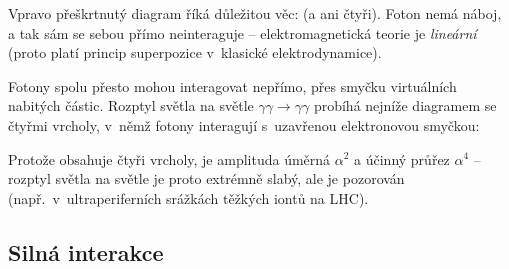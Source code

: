 Vpravo přeškrtnutý diagram říká důležitou věc:  (a ani čtyři). Foton nemá náboj, a tak sám se sebou přímo neinteraguje -- elektromagnetická teorie je \emph{lineární} (proto platí princip superpozice v~klasické elektrodynamice).

Fotony spolu přesto mohou interagovat nepřímo, přes smyčku virtuálních nabitých částic. Rozptyl světla na světle $\gamma\gamma\to\gamma\gamma$ probíhá nejníže diagramem se čtyřmi vrcholy, v~němž fotony interagují s~uzavřenou elektronovou smyčkou:
\begin{center}
\end{center}
Protože obsahuje čtyři vrcholy, je amplituda úměrná $\alpha^2$ a účinný průřez $\alpha^4$ -- rozptyl světla na světle je proto extrémně slabý, ale je pozorován (např.\ v~ultraperiferních srážkách těžkých iontů na LHC).

\subsection{Silná interakce}

